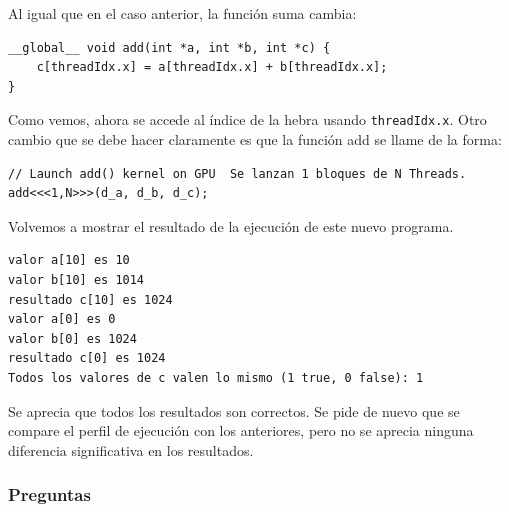 \documentclass[11pt]{article}
\def\inline{\lstinline[basicstyle=\ttfamily,keywordstyle={}]}
\theoremstyle{plain}
\begin{document}
Al igual que en el caso anterior, la función suma cambia:

\begin{verbatim}
__global__ void add(int *a, int *b, int *c) {
	c[threadIdx.x] = a[threadIdx.x] + b[threadIdx.x]; 
}
\end{verbatim}

Como vemos, ahora se accede al índice de la hebra usando \inline{threadIdx.x}. Otro cambio que se debe hacer claramente es que la función add se llame de la forma:
\begin{verbatim}
// Launch add() kernel on GPU  Se lanzan 1 bloques de N Threads.
add<<<1,N>>>(d_a, d_b, d_c);
\end{verbatim}
Volvemos a mostrar el resultado de la ejecución de este nuevo programa.
\begin{verbatim}
valor a[10] es 10
valor b[10] es 1014
resultado c[10] es 1024
valor a[0] es 0
valor b[0] es 1024
resultado c[0] es 1024
Todos los valores de c valen lo mismo (1 true, 0 false): 1	
\end{verbatim}

Se aprecia que todos los resultados son correctos. Se pide de nuevo que se compare el perfil de ejecución con los anteriores, pero no se aprecia ninguna diferencia significativa en los resultados.

\subsubsection{Preguntas}
\end{document}
